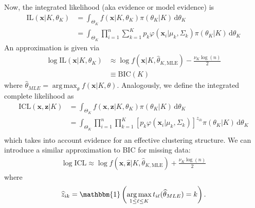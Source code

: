 \documentclass{uwstat572}
\newcommand*\ba{\[ \begin{aligned}}
\newcommand*\ea{\end{aligned} \]}
\newcommand*\ind[1]{\mathbbm{1}\left(#1\right)}
\newcommand*\estim[1]{\widehat{#1}}
\newcommand*\der{\text{d}}
\newcommand*\bx{\mathbf{x}}
\newcommand*\bz{\mathbf{z}}
\DeclareMathOperator*{\argmax}{arg\;max}
\renewcommand\;{\,}
\renewcommand\phi{\varphi}
\begin{document}
Now, the integrated likelihood (aka evidence or model evidence) is
\ba
\text{IL}(\bx | K, \theta_K)
	& = \int_{\Theta_{K}} f(\bx | K, \theta_K) \pi(\theta_K | K) \; \der \theta_K \\
	& = \int_{\Theta_{K}} \prod_{i=1}^n \sum_{k=1}^K p_k \phi(\bx_i | \mu_k, \Sigma_k) \pi(\theta_K | K) \; \der \theta_K
\ea
An approximation is given via
\ba
	\log \text{IL}(\bx | K, \theta_K) 
		& \approx \log f(\bx | K, \estim\theta_{K, \text{MLE}}) - \frac{\nu_K \log(n)}{2} \\
		& \equiv \text{BIC}(K)
\ea
where $\estim\theta_{MLE} = \argmax_\theta f(\bx | K, \theta)$. 
Analogously, we define the integrated complete likelihood as
\ba
\text{ICL}(\bx, \bz | K)
	& = \int_{\Theta_K} f(\bx, \bz | K, \theta_K) \pi(\theta_K | K) \; \der \theta_K \\
	& = \int_{\Theta_K} \prod_{i=1}^n \prod_{k = 1}^K 
		\left[ p_k \phi(\bx_i | \mu_k, \Sigma_k) \right]^{z_{ik}} \pi(\theta_K | K) \; \der \theta_K \\
\ea
which takes into account evidence for an effective clustering structure. 
We can introduce a similar approximation to BIC for missing data:
\ba
\log\text{ICL} \approx \log f(\bx, \estim\bz | K, \estim\theta_{K, \text{MLE}}) + \frac{ \nu_K \log(n) }{2}
\ea
where
\ba
\estim z_{ik} = \ind{ \argmax_{1 \le \ell \le K} t_{i \ell}(\estim\theta_{MLE}) = k }. 
\ea
\end{document}
